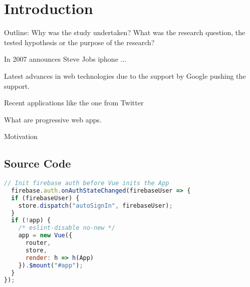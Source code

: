 \chapter{Introduction}

Outline: Why was the study undertaken?
What was the research question, the tested hypothesis or the purpose of the research?

In 2007 announces Steve Jobs iphone ...

Latest advances in web technologies due to the support by Google pushing the support.

Recent applications like the one from Twitter

What are progressive web apps.

Motivation
\cite{liebelProgressiveWebApps2019}

\section{Source Code}

\begin{lstlisting}[language=JavaScript, caption=Firebase Auth initiation, label=lst:firebase-auth]
// Init firebase auth before Vue inits the App
  firebase.auth.onAuthStateChanged(firebaseUser => {
  if (firebaseUser) {
    store.dispatch("autoSignIn", firebaseUser);
  }
  if (!app) {
    /* eslint-disable no-new */
    app = new Vue({
      router,
      store,
      render: h => h(App)
    }).$mount("#app");
  }
});
\end{lstlisting}

